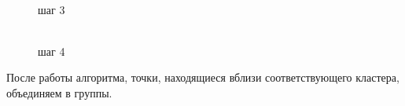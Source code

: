 \begin {itemize}
\begin{figure}[h]
\begin{minipage}[h]{0.47\linewidth}
\end{minipage}
\vfill
\begin{minipage}[h]{0.47\linewidth}
 \\ шаг 3
\end{minipage}
\hfill
\begin{minipage}[h]{0.47\linewidth}
 \\ шаг 4
\end{minipage}
\end{figure} 

После работы алгоритма, точки, находящиеся вблизи соответствующего кластера, объединяем в группы.
\end{itemize}

